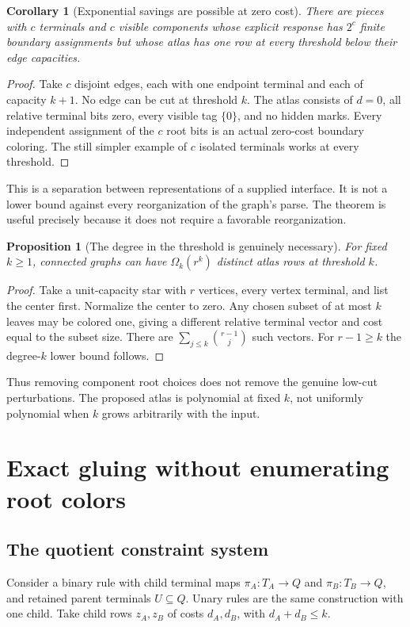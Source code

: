 \documentclass[11pt,letterpaper]{article}
\newtheorem{proposition}[theorem]{Proposition}
\newtheorem{corollary}[theorem]{Corollary}
\theoremstyle{definition}
\theoremstyle{remark}\newtheorem{remark}[theorem]{Remark}
\begin{document}
\begin{corollary}[Exponential savings are possible at zero cost]\label{cor:exp}
There are pieces with $c$ terminals and $c$ visible components whose explicit response has $2^c$ finite boundary assignments but whose atlas has one row at every threshold below their edge capacities.
\end{corollary}
\begin{proof}
Take $c$ disjoint edges, each with one endpoint terminal and each of capacity $k+1$. No edge can be cut at threshold $k$. The atlas consists of $d=0$, all relative terminal bits zero, every visible tag $\{0\}$, and no hidden marks. Every independent assignment of the $c$ root bits is an actual zero-cost boundary coloring. The still simpler example of $c$ isolated terminals works at every threshold.
\end{proof}
This is a separation between representations of a supplied interface. It is not a lower bound against every reorganization of the graph's parse. The theorem is useful precisely because it does not require a favorable reorganization.

\begin{proposition}[The degree in the threshold is genuinely necessary]\label{prop:sharp}
For fixed $k\ge1$, connected graphs can have $\Omega_k(r^k)$ distinct atlas rows at threshold $k$.
\end{proposition}
\begin{proof}
Take a unit-capacity star with $r$ vertices, every vertex terminal, and list the center first. Normalize the center to zero. Any chosen subset of at most $k$ leaves may be colored one, giving a different relative terminal vector and cost equal to the subset size. There are $\sum_{j\le k}\binom{r-1}{j}$ such vectors. For $r-1\ge k$ the degree-$k$ lower bound follows.
\end{proof}
Thus removing component root choices does not remove the genuine low-cut perturbations. The proposed atlas is polynomial at fixed $k$, not uniformly polynomial when $k$ grows arbitrarily with the input.

\section{Exact gluing without enumerating root colors}
\label{sec:gluing}
\subsection{The quotient constraint system}
Consider a binary rule with child terminal maps $\pi_A:T_A\to Q$ and $\pi_B:T_B\to Q$, and retained parent terminals $U\subseteq Q$. Unary rules are the same construction with one child. Take child rows $z_A,z_B$ of costs $d_A,d_B$, with $d_A+d_B\le k$.
\end{document}
